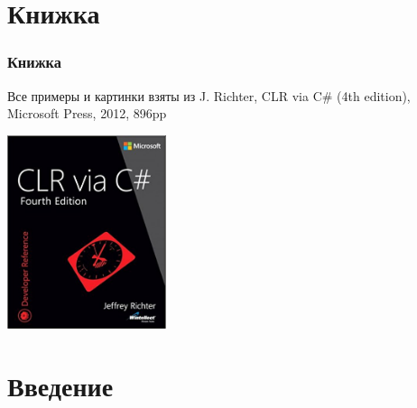 \documentclass{../../slides-style}
\begin{document}
    \frame{\titlepage}
    
    \section{Книжка}

    \begin{frame}
        \frametitle{Книжка}
        Все примеры и картинки взяты из J. Richter, CLR via C\# (4th edition), Microsoft Press, 2012, 896pp
        \begin{center}
            \includegraphics[width=0.35\textwidth]{richterCover.png}
        \end{center}
    \end{frame}

    \section{Введение}
\end{document}
